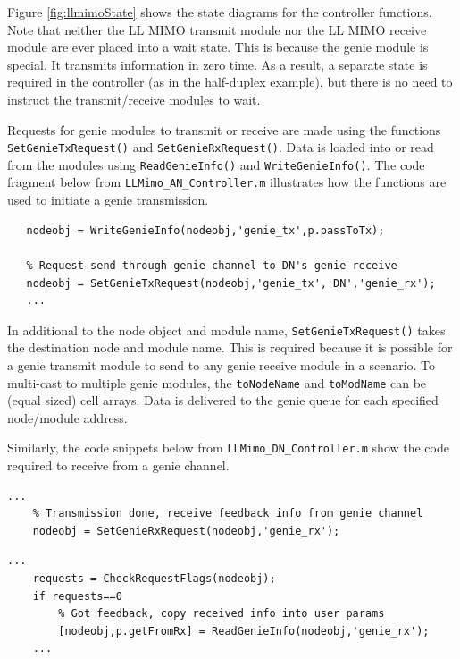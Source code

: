 Figure \ref{fig:llmimoState} shows the state diagrams for the
controller functions.  Note that neither the LL MIMO transmit module
nor the LL MIMO receive module are ever placed into a wait state.
This is because the genie module is special.  It transmits
information in zero time.  As a result, a separate state is required
in the controller (as in the half-duplex example), but there is no
need to instruct the transmit/receive modules to wait.

Requests for genie modules to transmit or receive are made using the
functions \verb+SetGenieTxRequest()+ and \verb+SetGenieRxRequest()+.
Data is loaded into or read from the modules using
\verb+ReadGenieInfo()+ and \verb+WriteGenieInfo()+. The code
fragment below from \verb+LLMimo_AN_Controller.m+ illustrates how
the functions are used to initiate a genie transmission.

\begin{lstlisting}[name=llmimoANCon,firstnumber=53]
   % Put send data into module's genie queue
   nodeobj = WriteGenieInfo(nodeobj,'genie_tx',p.passToTx);

   % Request send through genie channel to DN's genie receive
   nodeobj = SetGenieTxRequest(nodeobj,'genie_tx','DN','genie_rx');
   ...
\end{lstlisting}

In additional to the node object and module name,
\verb+SetGenieTxRequest()+ takes the destination node and module
name.  This is required because it is possible for a genie transmit
module to send to any genie receive module in a scenario.   To multi-cast to multiple genie modules, the \verb+toNodeName+ and \verb+toModName+ can be (equal sized) cell arrays.  Data is delivered to the genie queue for each specified node/module address.

Similarly, the code snippets below from
\verb+LLMimo_DN_Controller.m+ show the code required to receive from
a genie channel.

\begin{lstlisting}[name=llmimoDNCon,firstnumber=62]
    ...
    % Transmission done, receive feedback info from genie channel
    nodeobj = SetGenieRxRequest(nodeobj,'genie_rx');
\end{lstlisting}

\begin{lstlisting}[name=llmimoDNCon,firstnumber=72]
    ...
    requests = CheckRequestFlags(nodeobj);
    if requests==0
        % Got feedback, copy received info into user params
        [nodeobj,p.getFromRx] = ReadGenieInfo(nodeobj,'genie_rx');
    ...
\end{lstlisting}

